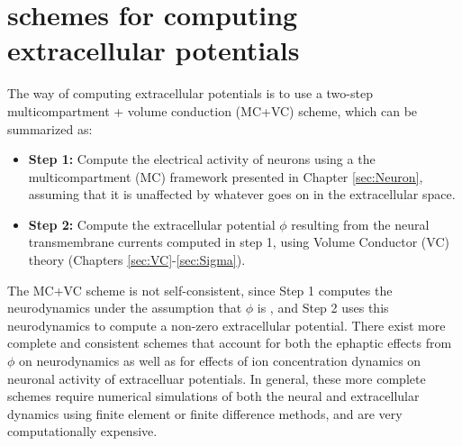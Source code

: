 \chapter{ schemes for computing extracellular potentials}
\label{sec:LFPy}


The  way of computing extracellular potentials is to use a two-step multicompartment + volume conduction (MC+VC) scheme, 
which can be summarized as: 

\begin{itemize}
\item {\bf Step 1:} Compute the electrical activity of neurons using a the multicompartment (MC) framework presented in Chapter \ref{sec:Neuron}, assuming that it is unaffected by whatever goes on in the extracellular space. 
\item {\bf Step 2:} Compute the extracellular potential $\phi$ resulting from the neural transmembrane currents computed in step 1, using Volume Conductor (VC) theory (Chapters \ref{sec:VC}-\ref{sec:Sigma}). 
\end{itemize}

The MC+VC scheme is not self-consistent, since Step 1 computes the neurodynamics under the assumption that $\phi$ is , 
and Step 2 uses this neurodynamics to compute a non-zero extracellular potential. 
There exist more complete and consistent schemes that account for both the ephaptic effects from $\phi$ on neurodynamics as well as for effects of ion concentration dynamics on neuronal activity of extracelluar potentials. In general, these more complete schemes require numerical simulations of both the neural and extracellular dynamics using finite element or finite difference methods, and are very computationally expensive.

